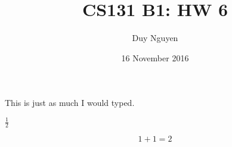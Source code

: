 \documentclass{article}
\title{CS131 B1: HW 6}
\author{Duy Nguyen}
\date{16 November 2016}
\begin{document}
\maketitle

This is just as much I would typed.

$\frac{1}{2}$

$$1+1=2$$
\end{document}
